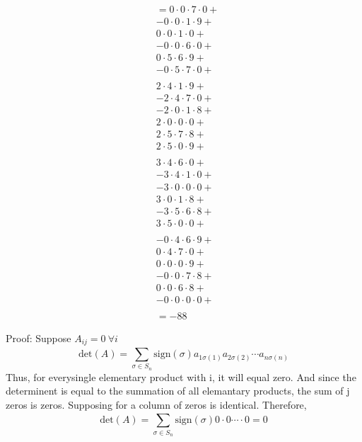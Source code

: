 \documentclass[letterpaper,12pt]{article}
\theoremstyle{definition}
\begin{document}
    \begin{align*}
    &= 0 \cdot 0 \cdot 7 \cdot 0 + \\
    & -0 \cdot 0 \cdot 1 \cdot 9 + \\
    & 0 \cdot 0 \cdot 1 \cdot 0 + \\
    & -0 \cdot 0 \cdot 6 \cdot 0 + \\
    & 0 \cdot 5 \cdot 6 \cdot 9 + \\
    & -0 \cdot 5 \cdot 7 \cdot 0 + \\
    \\
    & 2 \cdot 4 \cdot 1 \cdot 9 + \\
    & -2 \cdot 4 \cdot 7 \cdot 0 + \\
    & -2 \cdot 0 \cdot 1 \cdot 8 + \\
    & 2 \cdot 0 \cdot 0 \cdot 0 + \\
    & 2 \cdot 5 \cdot 7 \cdot 8 + \\
    & 2 \cdot 5 \cdot 0 \cdot 9 + \\
    \\
    & 3 \cdot 4 \cdot 6 \cdot 0 + \\
    & -3 \cdot 4 \cdot 1 \cdot 0 + \\
    & -3 \cdot 0 \cdot 0 \cdot 0 + \\
    & 3 \cdot 0 \cdot 1 \cdot 8 + \\
    & -3 \cdot 5 \cdot 6 \cdot 8 + \\
    & 3 \cdot 5 \cdot 0 \cdot 0 + \\
    \\
    & -0 \cdot 4 \cdot 6 \cdot 9 + \\
    & 0 \cdot 4 \cdot 7 \cdot 0 + \\
    & 0 \cdot 0 \cdot 0 \cdot 9 + \\
    & -0 \cdot 0 \cdot 7 \cdot 8 + \\
    & 0 \cdot 0 \cdot 6 \cdot 8 + \\
    & -0 \cdot 0 \cdot 0 \cdot 0 + \\
    \\
    & = -88
\end{align*}


Proof: Suppose $A_{ij} = 0~\forall i$\\
\[\text{det}(A) = \sum^{}_{\sigma \in S_n} \text{sign} (\sigma) a_{1 \sigma (1)}a_{2 \sigma (2)}\cdots a_{n \sigma (n)}\]
Thus, for everysingle elementary product with i, it will equal zero. And since the determinent is equal to the summation of all elemantary products, the sum of j zeros is zeros. Supposing for a column of zeros is identical.
Therefore,
\[\text{det}(A) = \sum^{}_{\sigma \in S_n} \text{sign} (\sigma) 0 \cdot 0 \cdots \cdot 0 = 0\]
\end{document}
